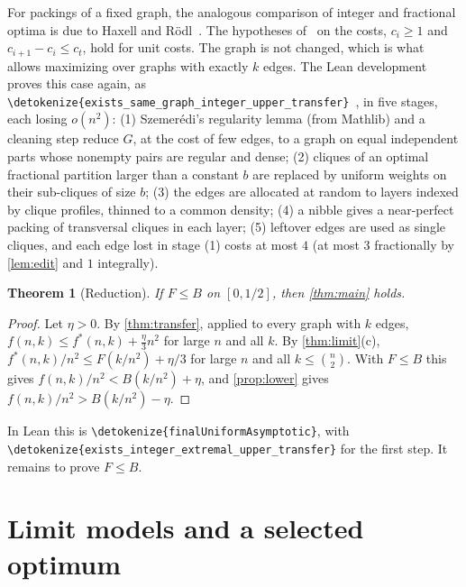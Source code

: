 \documentclass[10pt]{article}
\newtheorem{theorem}{Theorem}[section]
\theoremstyle{definition}
\theoremstyle{remark}
\numberwithin{equation}{section}
\newcommand{\leanid}[1]{\expandafter\nolinkurl\expandafter{\detokenize{#1}}}
\newcommand{\Fm}[1]{\cite[#1]{Formalization}}
\begin{document}
For packings of a fixed graph, the analogous comparison of integer and fractional optima is due to Haxell and R\"odl~\cite{HR01}. The hypotheses of~\cite[Theorem~1.10]{BHKNW26} on the costs, $c_i\ge1$ and $c_{i+1}-c_i\le c_t$, hold for unit costs. The graph is not changed, which is what allows maximizing over graphs with exactly $k$ edges. The Lean development proves this case again, as \leanid{exists_same_graph_integer_upper_transfer}~\Fm{\S5}, in five stages, each losing $o(n^2)$: (1) Szemer\'edi's regularity lemma (from Mathlib) and a cleaning step reduce $G$, at the cost of few edges, to a graph on equal independent parts whose nonempty pairs are regular and dense; (2) cliques of an optimal fractional partition larger than a constant $b$ are replaced by uniform weights on their sub-cliques of size $b$; (3) the edges are allocated at random to layers indexed by clique profiles, thinned to a common density; (4) a nibble gives a near-perfect packing of transversal cliques in each layer; (5) leftover edges are used as single cliques, and each edge lost in stage (1) costs at most $4$ (at most $3$ fractionally by \cref{lem:edit} and $1$ integrally).

\begin{theorem}[Reduction]\label{thm:reduction}
If $F\le B$ on $[0,1/2]$, then \cref{thm:main} holds.
\end{theorem}

\begin{proof}
Let $\eta>0$. By \cref{thm:transfer}, applied to every graph with $k$ edges, $f(n,k)\le f^*(n,k)+\frac\eta3n^2$ for large $n$ and all $k$. By \cref{thm:limit}(c), $f^*(n,k)/n^2\le F(k/n^2)+\eta/3$ for large $n$ and all $k\le\binom n2$. With $F\le B$ this gives $f(n,k)/n^2<B(k/n^2)+\eta$, and \cref{prop:lower} gives $f(n,k)/n^2>B(k/n^2)-\eta$.
\end{proof}

In Lean this is \leanid{finalUniformAsymptotic}, with \leanid{exists_integer_extremal_upper_transfer} for the first step. It remains to prove $F\le B$.

\section{Limit models and a selected optimum}\label{sec:models}
\end{document}
